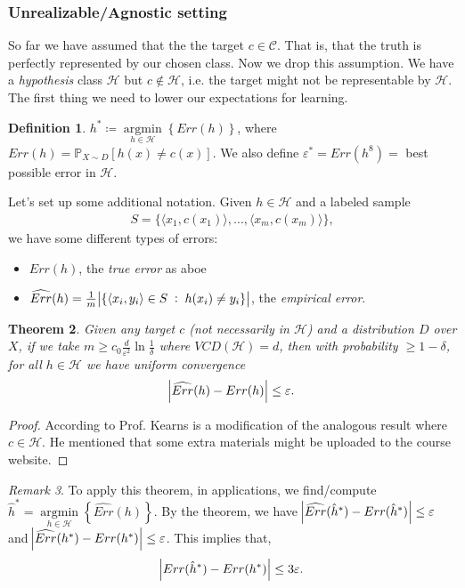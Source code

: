 \documentclass[12pt, letterpaper]{article}
\numberwithin{equation}{section} %
\newcommand{\mb}{\mathbb}
\newcommand{\mc}{\mathcal}
\newcommand{\ve}{\varepsilon}
\newtheorem{theorem}{Theorem}[section]
\theoremstyle{definition}
\newtheorem{definition}[theorem]{Definition}
\theoremstyle{remark}
\newtheorem{remark}[theorem]{Remark}
\begin{document}
\subsubsection{Unrealizable/Agnostic setting}
So far we have assumed that the the target $c\in\mc C$. That is, that the truth is perfectly represented by our chosen class. Now we drop this assumption. We have a \emph{hypothesis} class $\mc H$ but $c\not\in\mc H$, i.e. the target might not be representable by $\mc H$. The first thing we need to lower our expectations for learning.
\begin{definition}
    $h^*\coloneqq \mathop{argmin}\limits_{h\in\mc H}\left\{Err(h)\right\}$, where $Err(h) = \mb P_{X\sim D}[h(x)\ne c(x)]$. We also define $\ve^* = Err(h^8)=$ best possible error in $\mc H.$
\end{definition}
Let's set up some additional notation. Given $h\in \mc H$ and a labeled sample
\begin{align}
    S=\lbrace \langle x_1, c(x_1)\rangle,\ldots,\langle x_m, c(x_m)\rangle\rbrace,
\end{align}
we have some different types of errors:
\begin{itemize}
\item $Err(h)$, the \emph{true error} as aboe
\item $\widehat{Err}(h) = \frac1m \abs{\lbrace \langle x_i, y_i\rangle \in S \;:\;h(x_i)\ne y_i\rbrace}$, the \emph{empirical error}.
\end{itemize}

\begin{theorem}
    Given any target $c$ (not necessarily in $\mc H$) and a distribution $D$ over $X$, if we take $m\geq c_0 \frac d{\ve^2}\ln \frac1\delta$ where $VCD(\mc H)=d$, then with probability $\geq 1-\delta$, for all $h\in\mc H$ we have \emph{uniform} convergence
    \begin{align}
        \abs{\widehat{Err}(h)-Err(h)} \leq \ve.
    \end{align}
\end{theorem}
\begin{proof}
    According to Prof. Kearns is a modification of the analogous result where $c\in\mc H$. He mentioned that some extra materials might be uploaded to the course website.
\end{proof}
\begin{remark}
    To apply this theorem, in applications, we find/compute $\hat h^* = \mathop{argmin}\limits_{h\in\mc H}\left\{\widehat{Err}(h)\right\}$. By the theorem, we have
    $ \abs{\widehat{Err}(\hat h^*)-Err(\hat h^*)} \leq \ve$ and  $\abs{\widehat{Err}(h^*)-Err(h^*)} \leq \ve$. This implies that,
    \begin{align}
        \abs{Err(\hat h^*) - Err(h^*)} \leq 3\ve.
    \end{align}
\end{remark}
\end{document}
